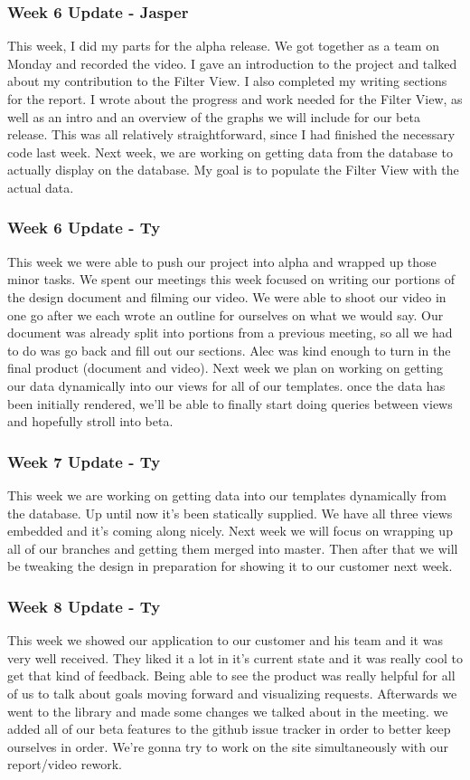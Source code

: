 \subsubsection{Week 6 Update - Jasper}
This week, I did my parts for the alpha release.
We got together as a team on Monday and recorded the video.
I gave an introduction to the project and talked about my contribution to the Filter View.
I also completed my writing sections for the report.
I wrote about the progress and work needed for the Filter View, as well as an intro and an overview of the graphs we will include for our beta release.
This was all relatively straightforward, since I had finished the necessary code last week.
Next week, we are working on getting data from the database to actually display on the database.
My goal is to populate the Filter View with the actual data.

\subsubsection{Week 6 Update - Ty}
This week we were able to push our project into alpha and wrapped up those minor tasks.
We spent our meetings this week focused on writing our portions of the design document and filming our video.
We were able to shoot our video in one go after we each wrote an outline for ourselves on what we would say.
Our document was already split into portions from a previous meeting, so all we had to do was go back and fill out our sections.
Alec was kind enough to turn in the final product (document and video).
Next week we plan on working on getting our data dynamically into our views for all of our templates.
once the data has been initially rendered, we'll be able to finally start doing queries between views and hopefully stroll into beta. ​

\subsubsection{Week 7 Update - Ty}
This week we are working on getting data into our templates dynamically from the database.
Up until now it's been statically supplied.
We have all three views embedded and it's coming along nicely.
Next week we will focus on wrapping up all of our branches and getting them merged into master.
Then after that we will be tweaking the design in preparation for showing it to our customer next week.​

\subsubsection{Week 8 Update - Ty}
This week we showed our application to our customer and his team and it was very well received.
They liked it a lot in it's current state and it was really cool to get that kind of feedback.
Being able to see the product was really helpful for all of us to talk about goals moving forward and visualizing requests.
​Afterwards we went to the library and made some changes we talked about in the meeting.
we added all of our beta features to the github issue tracker in order to better keep ourselves in order.
We're gonna try to work on the site simultaneously with our report/video rework.

